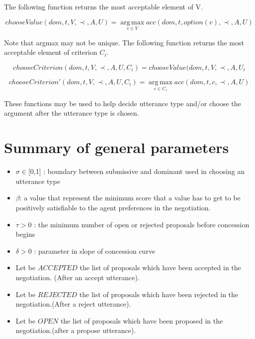\documentclass{article}
\begin{document}
	
	The following function returns the most acceptable element of V.

	 $$ chooseValue(dom, t, V, \prec, A, U) =	\operatorname*{arg\,max}_{v \in V} acc(dom, t, option(v), \prec, A, U) $$
	
	Note that argmax may not be unique.  The following function returns the most acceptable element of	criterion $C_i$.
	
	$$chooseCriterion(dom, t, V, \prec, A, U, C_i) = chooseValue(dom, t, V, \prec, A, U_i$$
	
	
	$$chooseCriterion'(dom, t, V, \prec, A, U, C_i) =	\operatorname*{arg\,max}_{c\in C_i} acc(dom, t, c, \prec, A, U)$$
	
	These functions may be used to help decide utterance type and/or choose the argument after the utterance type is chosen.
	
	\section{Summary of general parameters }
	\begin{itemize}

		\item $\sigma \in $[0,1] : boundary between submissive and dominant used in
				choosing an utterance type
		\item $\beta$:  a value that represent the minimum score that a value has to get to be positively satisfiable to the agent preferences in the negotiation.
		\item $\tau > 0$ : the minimum number of open or rejected proposals before
				concession begins
		\item $\delta > 0$ : parameter in slope of concession curve
		\item Let be $ACCEPTED$ the list of proposals which have been accepted in the negotiation. (After an accept utterance).
		\item Let be $REJECTED$ the list of proposals which have been rejected in the negotiation.(After a reject utterance).
		\item Let be $OPEN$ the list of proposals which have been proposed in the negotiation.(after a propose utterance).
		
	\end{itemize}

	
%	
%	
%	
	
\end{document}
